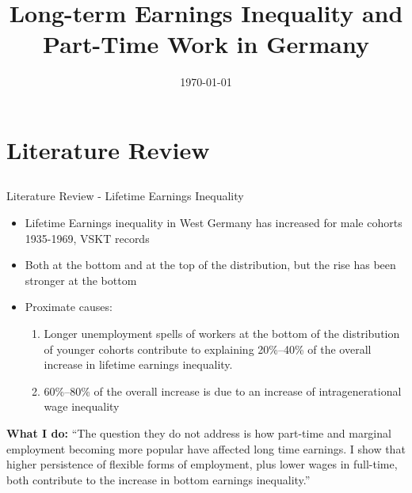 \documentclass[hyperref={bookmarks=false}]{beamer}
\title{Long-term Earnings Inequality and Part-Time Work in Germany}
\author[Short Name (U ABC)]{%
  \texorpdfstring{%
    \begin{columns}
      \column{.5\linewidth}
      \centering
Manuel Sanchez
    \end{columns}
 }
{Author 1}
}
\institute{University of Bristol}
\date{\today}
\let\oldcite=\cite
\renewcommand{\cite}[1]{\textcolor[rgb]{.0,.2,.7}{\oldcite{#1}}}
\begin{document}


\section{Literature Review}
\subsection{}

\begin{frame}
\end{frame}

\begin{frame}{Literature Review - Lifetime Earnings Inequality}
\cite{BoCo15}
\begin{itemize}
\item Lifetime Earnings inequality in West Germany has increased for male cohorts 1935-1969, VSKT records
\item Both at the bottom and at the top of the distribution, but the rise has been
stronger at the bottom
\item Proximate causes:
\begin{enumerate}
\item Longer unemployment spells of workers at the bottom of the
distribution of younger cohorts contribute to explaining 20\%–40\%
of the overall increase in lifetime earnings inequality.
\item 60\%–80\%
of the overall increase is due to an increase of intragenerational wage inequality
\end{enumerate}
\end{itemize}
\textbf{What I do:} ``The question they do not address is how part-time and marginal employment becoming more popular have affected long time earnings. I show that
higher persistence of flexible forms of employment, plus lower wages in full-time,
both contribute to the increase in bottom earnings inequality.''
\end{frame}
\end{document}
